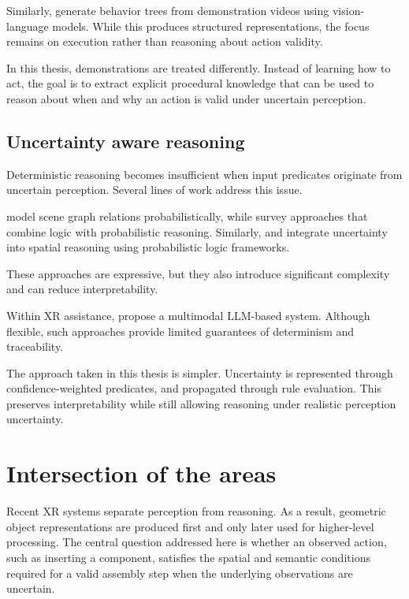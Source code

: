 \documentclass[11pt,titlepage,openright]{book}
\begin{document}
Similarly, \citet{Zhao2025VideoToBT} generate behavior trees from demonstration videos using vision-language models. While this produces structured representations, the focus remains on execution rather than reasoning about action validity.

In this thesis, demonstrations are treated differently. Instead of learning how to act, the goal is to extract explicit procedural knowledge that can be used to reason about when and why an action is valid under uncertain perception.



\subsection{Uncertainty aware reasoning}
\label{sec:uncertainty-aware-reasoning}

Deterministic reasoning becomes insufficient when input predicates originate from uncertain perception. Several lines of work address this issue.

\citet{Biswas_2023} model scene graph relations probabilistically, while \citet{Marra_2024} survey approaches that combine logic with probabilistic reasoning. Similarly, \citet{Duckham_2023} and \citet{Pryor_2023} integrate uncertainty into spatial reasoning using probabilistic logic frameworks.

These approaches are expressive, but they also introduce significant complexity and can reduce interpretability.

Within XR assistance, \citet{Qorbani_2025} propose a multimodal LLM-based system. Although flexible, such approaches provide limited guarantees of determinism and traceability.

The approach taken in this thesis is simpler. Uncertainty is represented through confidence-weighted predicates, and propagated through rule evaluation. This preserves interpretability while still allowing reasoning under realistic perception uncertainty.


\section{Intersection of the areas}
\label{sec:intersection-of-areas}

Recent XR systems separate perception from reasoning. As a result, geometric object representations are produced first and only later used for higher-level processing. The central question addressed here is whether an observed action, such as inserting a component, satisfies the spatial and semantic conditions required for a valid assembly step when the underlying observations are uncertain.
\end{document}
